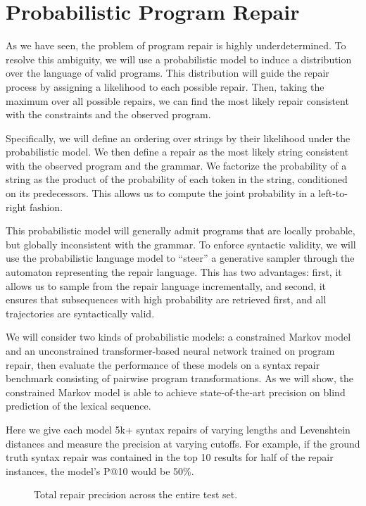 \chapter{\rm\bfseries Probabilistic Program Repair}
\label{ch:chapter03}

As we have seen, the problem of program repair is highly underdetermined. To resolve this ambiguity, we will use a probabilistic model to induce a distribution over the language of valid programs. This distribution will guide the repair process by assigning a likelihood to each possible repair. Then, taking the maximum over all possible repairs, we can find the most likely repair consistent with the constraints and the observed program.

Specifically, we will define an ordering over strings by their likelihood under the probabilistic model. We then define a repair as the most likely string consistent with the observed program and the grammar. We factorize the probability of a string as the product of the probability of each token in the string, conditioned on its predecessors. This allows us to compute the joint probability in a left-to-right fashion.

This probabilistic model will generally admit programs that are locally probable, but globally inconsistent with the grammar. To enforce syntactic validity, we will use the probabilistic language model to ``steer'' a generative sampler through the automaton representing the repair language. This has two advantages: first, it allows us to sample from the repair language incrementally, and second, it ensures that subsequences with high probability are retrieved first, and all trajectories are syntactically valid.

We will consider two kinds of probabilistic models: a constrained Markov model and an unconstrained transformer-based neural network trained on program repair, then evaluate the performance of these models on a syntax repair benchmark consisting of pairwise program transformations. As we will show, the constrained Markov model is able to achieve state-of-the-art precision on blind prediction of the lexical sequence.

Here we give each model 5k+ syntax repairs of varying lengths and Levenshtein distances and measure the precision at varying cutoffs. For example, if the ground truth syntax repair was contained in the top 10 results for half of the repair instances, the model's P@10 would be 50\%.

\begin{figure}[H]
  \resizebox{.24\textwidth}{!}{}
  \resizebox{.24\textwidth}{!}{}
  \resizebox{.24\textwidth}{!}{}
  \resizebox{.24\textwidth}{!}{}
  \caption{Total repair precision across the entire test set.}
\end{figure}

